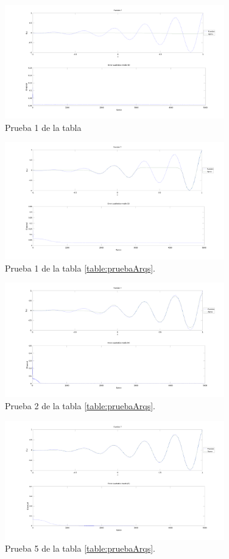 \documentclass[11pt,a4paper]{article}
\begin{document}
\begin{figure}[h]
\centering
\includegraphics[width=0.85\textwidth]{img/PruebaRecu11.png}
\caption{\label{fig:PruebaRecu11} Prueba 1 de la tabla}
\end{figure}

\begin{figure}[h]
\centering
\includegraphics[width=0.85\textwidth]{img/PruebaRecu1.png}
\caption{\label{fig:pruebaRecu1} Prueba 1 de la tabla \ref{table:pruebaArqs}.}
\end{figure}

\begin{figure}[h]
\centering
\includegraphics[width=0.85\textwidth]{img/PruebaRecu15.png}
\caption{\label{fig:pruebaRecu15} Prueba 2 de la tabla \ref{table:pruebaArqs}.}
\end{figure}

\begin{figure}[h]
\centering
\includegraphics[width=0.85\textwidth]{img/PruebaRecu10.png}
\caption{\label{fig:pruebaRecu10} Prueba 5 de la tabla \ref{table:pruebaArqs}.}
\end{figure}
\end{document}
